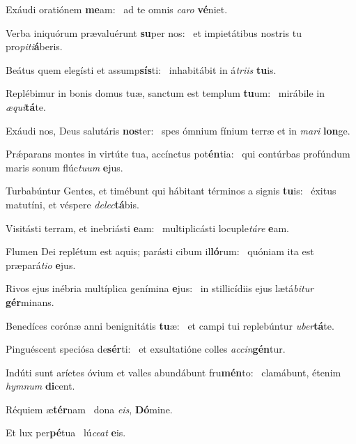 \item Exáudi oratiónem \textbf{me}am:~\psstar{} ad te omnis \textit{ca}\textit{ro} \textbf{vé}niet.

\item Verba iniquórum prævaluérunt \textbf{su}per nos:~\psstar{} et impietátibus nostris tu pro\textit{pi}\textit{ti}\textbf{á}beris.

\item Beátus quem elegísti et assump\textbf{sís}ti:~\psstar{} inhabitábit in á\textit{tri}\textit{is} \textbf{tu}is.

\item Replébimur in bonis domus tuæ, sanctum est templum \textbf{tu}um:~\psstar{} mirábile in \textit{æ}\textit{qui}\textbf{tá}te.

\item Exáudi nos, Deus salutáris \textbf{nos}ter:~\psstar{} spes ómnium fínium terræ et in \textit{ma}\textit{ri} \textbf{lon}ge.

\item Prǽparans montes in virtúte tua, accínctus pot\textbf{én}tia:~\psstar{} qui contúrbas profúndum maris sonum flúc\textit{tu}\textit{um} \textbf{e}jus.

\item Turbabúntur Gentes, et timébunt qui hábitant términos a signis \textbf{tu}is:~\psstar{} éxitus matutíni, et véspere \textit{de}\textit{lec}\textbf{tá}bis.

\item Visitásti terram, et inebriásti \textbf{e}am:~\psstar{} multiplicásti locuple\textit{tá}\textit{re} \textbf{e}am.

\item Flumen Dei replétum est aquis; parásti cibum il\textbf{ló}rum:~\psstar{} quóniam ita est præpará\textit{ti}\textit{o} \textbf{e}jus.

\item Rivos ejus inébria multíplica genímina \textbf{e}jus:~\psstar{} in stillicídiis ejus lætá\textit{bi}\textit{tur} \textbf{gér}minans.

\item Benedíces corónæ anni benignitátis \textbf{tu}æ:~\psstar{} et campi tui replebúntur \textit{u}\textit{ber}\textbf{tá}te.

\item Pinguéscent speciósa de\textbf{sér}ti:~\psstar{} et exsultatióne colles \textit{ac}\textit{cin}\textbf{gén}tur.

\item Indúti sunt aríetes óvium et valles abundábunt fru\textbf{mén}to:~\psstar{} clamábunt, étenim \textit{hym}\textit{num} \textbf{di}cent.

\item Réquiem æ\textbf{tér}nam~\psstar{} dona \textit{e}\textit{is}, \textbf{Dó}mine.

\item Et lux per\textbf{pé}tua~\psstar{} lú\textit{ce}\textit{at} \textbf{e}is.